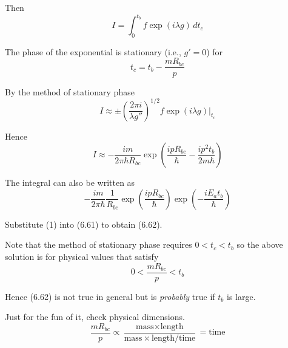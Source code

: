 \documentclass[12pt]{article}
\begin{document}
Then
\begin{equation*}
I=\int_0^{t_b}f\exp(i\lambda g)\,dt_c
\end{equation*}

The phase of the exponential is stationary (i.e., $g'=0$) for
\begin{equation*}
t_c=t_b-\frac{mR_{bc}}{p}
\end{equation*}

By the method of stationary phase
\begin{equation*}
I\approx\pm\left(\frac{2\pi i}{\lambda g''}\right)^{1/2}
f\exp(i\lambda g)\bigg|_{t_c}
\end{equation*}

Hence
\begin{equation*}
I\approx-\frac{im}{2\pi\hbar R_{bc}}
\exp\left(\frac{ipR_{bc}}{\hbar}-\frac{ip^2t_b}{2m\hbar}\right)
\end{equation*}

The integral can also be written as
\begin{equation*}
-\frac{im}{2\pi\hbar}
\frac{1}{R_{bc}}
\exp\left(\frac{ipR_{bc}}{\hbar}\right)
\exp\left(-\frac{iE_at_b}{\hbar}\right)
\tag{1}
\end{equation*}

Substitute (1) into (6.61) to obtain (6.62).

\bigskip
Note that the method of stationary phase requires $0<t_c<t_b$ so the above
solution is for physical values that satisfy
\begin{equation*}
0<\frac{mR_{bc}}{p}<t_b
\end{equation*}

Hence (6.62) is not true in general but is {\it probably} true if $t_b$ is large.

\bigskip
Just for the fun of it, check physical dimensions.
\begin{equation*}
\frac{mR_{bc}}{p}\propto
\frac{\text{mass}\times\text{length}}{\text{mass}\times\text{length}/\text{time}}
=\text{time}
\end{equation*}
\end{document}
